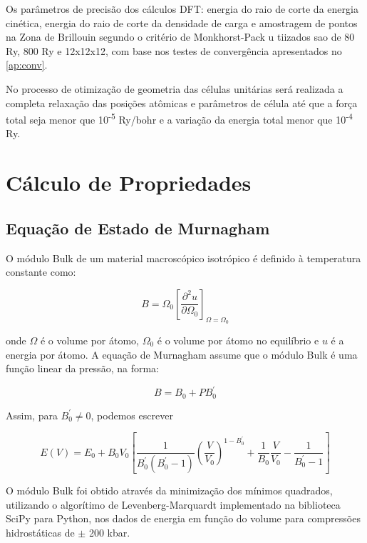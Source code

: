 	Os parâmetros de precisão dos cálculos DFT: energia do raio de corte da energia cinética, energia do raio de corte da densidade de carga e amostragem de pontos na Zona de Brillouin segundo o critério de Monkhorst-Pack \cite{monkhorst1976special} u tiizados sao de 80 Ry, 800 Ry e 12x12x12, com base nos testes de convergência apresentados no \autoref{ap:conv}. 
	
	No processo de otimização de geometria das células unitárias será realizada a completa relaxação das posições atômicas e parâmetros de célula  até que a força total seja menor que 10\textsuperscript{-5} Ry/bohr e a variação da energia total menor que 10\textsuperscript{-4} Ry.

\section{Cálculo de Propriedades}
	
	\subsection{Equação de Estado de Murnagham}
		O módulo Bulk de um material macroscópico isotrópico é definido à temperatura constante como:
		
		\begin{equation}
			\label{bulk_def}
			B = \Omega_0\left[\frac{\partial^2u}{\partial\Omega_0}\right]_{\Omega=\Omega_0}
		\end{equation}
		
		onde $\Omega$ é o volume por átomo, $\Omega_0$ é o volume por átomo no equilíbrio e $u$ é a energia por átomo. A equação de Murnagham \cite{macdonald1969review} assume que o módulo Bulk é uma função linear da pressão, na forma:
		
		\begin{equation}
			\label{murnagham1}
			B = B_0 + PB^\prime_0
		\end{equation}
		
		Assim, para $B^\prime_0 \neq 0$, podemos escrever
		
		\begin{equation}
			\label{murnagham}
			E(V) = E_0 + B_0V_0 \left[ \frac{1}{B^\prime_0(B^\prime_0-1)}\left(\frac{V}{V_0}\right)^{1-B^\prime_0} + \frac{1}{B_0}\frac{V}{V_0} -\frac{1}{B^\prime_0 -1}\right]
		\end{equation} 
		
		O módulo Bulk foi obtido através da minimização dos mínimos quadrados, utilizando o algorítimo de Levenberg-Marquardt implementado na biblioteca SciPy \cite{jones2001scipy} para Python, nos dados de energia em função do volume para compressões hidrostáticas de $\pm$ 200 kbar.
		
